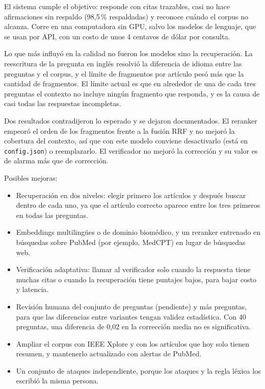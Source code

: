 El sistema cumple el objetivo: responde con citas trazables, casi no hace afirmaciones sin respaldo
(98,5\,\% respaldadas) y reconoce cuándo el corpus no alcanza. Corre en una computadora sin GPU, salvo
los modelos de lenguaje, que se usan por API, con un costo de unos 4 centavos de dólar por consulta.

Lo que más influyó en la calidad no fueron los modelos sino la recuperación. La reescritura de la
pregunta en inglés resolvió la diferencia de idioma entre las preguntas y el corpus, y el límite de
fragmentos por artículo pesó más que la cantidad de fragmentos. El límite actual es que en alrededor
de una de cada tres preguntas el contexto no incluye ningún fragmento que responda, y es la causa de
casi todas las respuestas incompletas.

Dos resultados contradijeron lo esperado y se dejaron documentados. El reranker empeoró el orden de
los fragmentos frente a la fusión RRF y no mejoró la cobertura del contexto, así que con este modelo
conviene desactivarlo (está en \texttt{config.json}) o reemplazarlo. El verificador no mejoró la
corrección y su valor es de alarma más que de corrección.

Posibles mejoras:
\begin{itemize}
\item Recuperación en dos niveles: elegir primero los artículos y después buscar dentro de cada uno,
ya que el artículo correcto aparece entre los tres primeros en todas las preguntas.
\item Embeddings multilingües o de dominio biomédico, y un reranker entrenado en búsquedas sobre
PubMed (por ejemplo, MedCPT) en lugar de búsquedas web.
\item Verificación adaptativa: llamar al verificador solo cuando la respuesta tiene muchas citas o
cuando la recuperación tiene puntajes bajos, para bajar costo y latencia.
\item Revisión humana del conjunto de preguntas (pendiente) y más preguntas, para que las diferencias
entre variantes tengan validez estadística. Con 40 preguntas, una diferencia de 0,02 en la
corrección media no es significativa.
\item Ampliar el corpus con IEEE Xplore y con los artículos que hoy solo tienen resumen, y mantenerlo
actualizado con alertas de PubMed.
\item Un conjunto de ataques independiente, porque los ataques y la regla léxica los escribió la
misma persona.
\end{itemize}

